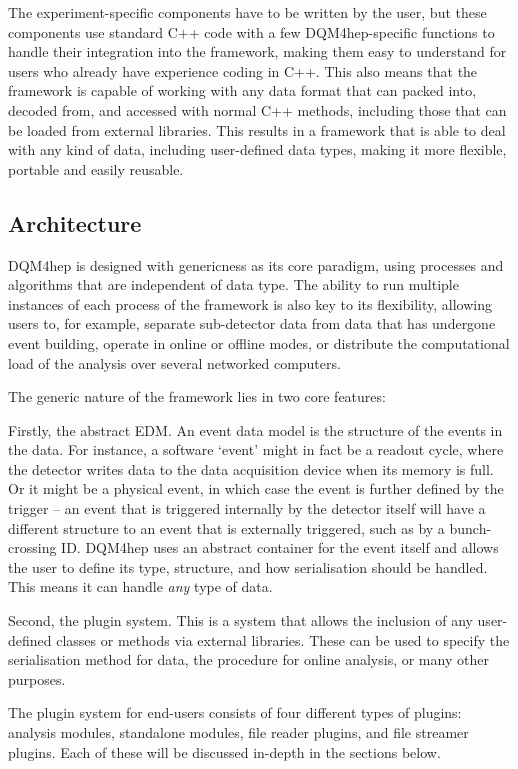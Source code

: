 The experiment-specific components have to be written by the user, but these components use standard C++ code with a few \acrshort{DQM4hep}-specific functions to handle their integration into the framework, making them easy to understand for users who already have experience coding in C++. This also means that the framework is capable of working with any data format that can packed into, decoded from, and accessed with normal C++ methods, including those that can be loaded from external libraries. This results in a framework that is able to deal with any kind of data, including user-defined data types, making it more flexible, portable and easily reusable.

\subsection{Architecture}
\acrshort{DQM4hep} is designed with genericness as its core paradigm, using processes and algorithms that are independent of data type. The ability to run multiple instances of each process of the framework is also key to its flexibility, allowing users to, for example, separate sub-detector data from data that has undergone event building, operate in online or offline modes, or distribute the computational load of the analysis over several networked computers.

The generic nature of the framework lies in two core features:

Firstly, the abstract \acrfull{EDM}. An event data model is the structure of the events in the data. For instance, a software `event' might in fact be a readout cycle, where the detector writes data to the data acquisition device when its memory is full. Or it might be a physical event, in which case the event is further defined by the trigger -- an event that is triggered internally by the detector itself will have a different structure to an event that is externally triggered, such as by a bunch-crossing ID. \acrshort{DQM4hep} uses an abstract container for the event itself and allows the user to define its type, structure, and how serialisation should be handled. This means it can handle \textit{any} type of data.

Second, the plugin system. This is a system that allows the inclusion of any user-defined classes or methods via external libraries. These can be used to specify the serialisation method for data, the procedure for online analysis, or many other purposes. 

The plugin system for end-users consists of four different types of plugins: analysis modules, standalone modules, file reader plugins, and file streamer plugins. Each of these will be discussed in-depth in the sections below.

